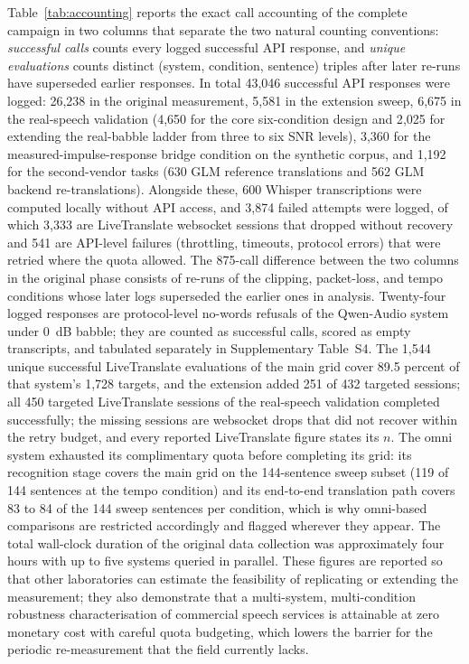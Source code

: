 Table~\ref{tab:accounting} reports the exact call accounting of the complete
campaign in two columns that separate the two natural counting
conventions: \emph{successful calls} counts every logged successful
API response, and \emph{unique evaluations} counts distinct
(system, condition, sentence) triples after later re-runs have superseded
earlier responses. In total 43{,}046 successful API responses were
logged: 26{,}238 in the original measurement, 5{,}581 in the extension
sweep, 6{,}675 in the real-speech validation (4{,}650 for the core
six-condition design and 2{,}025 for extending the real-babble ladder from
three to six SNR levels), 3{,}360 for the measured-impulse-response bridge
condition on the synthetic corpus, and 1{,}192 for the second-vendor tasks
(630 GLM reference translations and 562 GLM backend re-translations).
Alongside these, 600 Whisper transcriptions were computed locally without
API access, and 3{,}874 failed attempts were logged, of which 3{,}333 are
LiveTranslate websocket sessions that dropped without recovery and 541 are
API-level failures (throttling, timeouts, protocol errors) that were
retried where the quota allowed. The 875-call difference
between the two columns in the original phase consists of re-runs of the
clipping, packet-loss, and tempo conditions whose later logs superseded the
earlier ones in analysis. Twenty-four logged responses are protocol-level
no-words refusals of the Qwen-Audio system under 0~dB babble; they are
counted as successful calls, scored as empty transcripts, and tabulated
separately in Supplementary Table~S4. The 1{,}544 unique successful
LiveTranslate evaluations of the main grid cover 89.5 percent of that
system's 1{,}728 targets, and the extension added 251 of 432 targeted
sessions; all 450 targeted LiveTranslate sessions
of the real-speech validation completed successfully; the missing sessions
are websocket drops that did not recover within the
retry budget, and every reported LiveTranslate figure states its $n$. The
omni system exhausted its complimentary quota before completing its grid:
its recognition stage covers the main grid on the 144-sentence sweep subset
(119 of 144 sentences at the tempo condition) and its end-to-end
translation path covers 83 to 84 of the 144 sweep sentences per condition,
which is why omni-based comparisons are restricted accordingly and flagged
wherever they appear. The total wall-clock duration of the original data
collection was approximately four hours with up to five systems queried in
parallel. These figures are reported so that other laboratories can
estimate the feasibility of replicating or extending the measurement; they
also demonstrate that a multi-system, multi-condition robustness
characterisation of commercial speech services is attainable at zero
monetary cost with careful quota budgeting, which lowers the barrier for
the periodic re-measurement that the field currently lacks.

